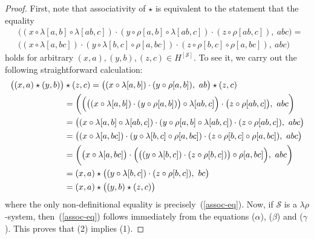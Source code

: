 \documentclass{amsart}
\begin{document}
\begin{proof} First, note that associativity of 
  $\star$ is equivalent to the statement that the equality
\begin{equation}\label{assoc-eq}
\begin{split}
&\bigl((x\circ\lambda[a,b]\circ\lambda[ab,c])
   \cdot(y\circ\rho[a,b]\circ\lambda[ab,c]) 
   \cdot(z\circ\rho[ab,c]),\ abc\bigr) = \\
&\bigl((x\circ\lambda[a,bc])
   \cdot(y\circ\lambda[b,c]\circ\rho[a,bc]) 
   \cdot(z\circ\rho[b,c]\circ\rho[a,bc]),\ abc\bigr)
\end{split}
\end{equation} 
holds for arbitrary $(x,a), (y,b), (z,c)\in H^{[\mathcal{S}]}$. 
To see it, we carry out the following straightforward calculation:
\begin{align*}
\bigl((x,a)\star(y,b)\bigr)&\star(z,c) = 
\bigl((x\circ\lambda[a,b])\cdot(y\circ\rho[a,b]),\ ab\bigr)\star (z,c) \\
&= \biggl(\Bigl(\bigl((x\circ\lambda[a,b])\cdot(y\circ\rho[a,b])\bigr)
   \circ\lambda[ab,c]\Bigr) 
   \cdot\bigl(z\circ\rho[ab,c]\bigr),\ abc\biggr) \\
&= \bigl((x\circ\lambda[a,b]\circ\lambda[ab,c])
   \cdot(y\circ\rho[a,b]\circ\lambda[ab,c]) 
   \cdot(z\circ\rho[ab,c]),\ abc\bigr) \\
&= \bigl((x\circ\lambda[a,bc])
   \cdot(y\circ\lambda[b,c]\circ\rho[a,bc]) 
   \cdot(z\circ\rho[b,c]\circ\rho[a,bc]),\ abc\bigr)\\
&= \biggl(\bigl(x\circ\lambda[a,bc]\bigr)
   \cdot\Bigl(\bigl((y\circ\lambda[b,c]) 
   \cdot(z\circ\rho[b,c])\bigr)\circ\rho[a,bc]\Bigr),\ abc\biggr) \\
&= (x,a)\star
   \bigl((y\circ\lambda[b,c])\cdot(z\circ\rho[b,c]),\ bc\bigr)\\
&= (x,a)\star\bigl((y,b)\star(z,c)\bigr)  
\end{align*}
where the only non-definitional equality is precisely~(\ref{assoc-eq}).
Now, if $\mathcal{S}$ is a  $\lambda\rho$-system, then~(\ref{assoc-eq}) 
follows immediately from the equations ($\alpha$), ($\beta$) and ($\gamma$).
This proves that (2) implies (1).


\end{proof}
\end{document}

